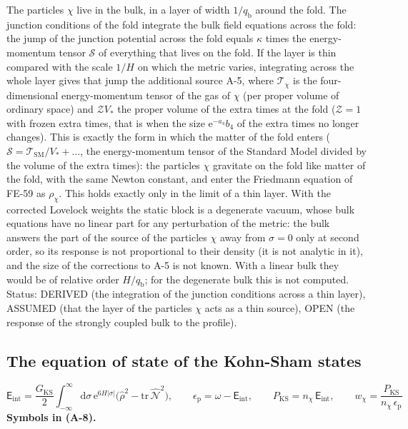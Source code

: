 \documentclass[
  10pt,
]{article}
\begin{document}
The particles \(\chi\) live in the bulk, in a layer of width
\(1/q_{\mathrm{b}}\) around the fold. The junction conditions of the
fold integrate the bulk field equations across the fold: the jump of the
junction potential across the fold equals \(\kappa\) times the
energy-momentum tensor \(\mathcal{S}\) of everything that lives on the
fold. If the layer is thin compared with the scale \(1/H\) on which the
metric varies, integrating across the whole layer gives that jump the
additional source A-5, where \(\mathcal{T}_\chi\) is the
four-dimensional energy-momentum tensor of the gas of \(\chi\) (per
proper volume of ordinary space) and \(\mathcal{Z}V_*\) the proper
volume of the extra times at the fold (\(\mathcal{Z} = 1\) with frozen
extra times, that is when the size \(\mathrm{e}^{-a_4}b_4\) of the extra
times no longer changes). This is exactly the form in which the matter
of the fold enters
(\(\mathcal{S} = \mathcal{T}_{\mathrm{SM}}/V_* + \dots\), the
energy-momentum tensor of the Standard Model divided by the volume of
the extra times): the particles \(\chi\) gravitate on the fold like
matter of the fold, with the same Newton constant, and enter the
Friedmann equation of FE-59 as \(\rho_\chi\). This holds exactly only in
the limit of a thin layer. With the corrected Lovelock weights the
static block is a degenerate vacuum, whose bulk equations have no linear
part for any perturbation of the metric: the bulk answers the part of
the source of the particles \(\chi\) away from \(\sigma = 0\) only at
second order, so its response is not proportional to their density (it
is not analytic in it), and the size of the corrections to A-5 is not
known. With a linear bulk they would be of relative order
\(H/q_{\mathrm{b}}\); for the degenerate bulk this is not computed.
Status: DERIVED (the integration of the junction conditions across a
thin layer), ASSUMED (that the layer of the particles \(\chi\) acts as a
thin source), OPEN (the response of the strongly coupled bulk to the
profile).

\hypertarget{the-equation-of-state-of-the-kohn-sham-states}{%
\subsection{The equation of state of the Kohn-Sham
states}\label{the-equation-of-state-of-the-kohn-sham-states}}

\[
\mathsf{E}_{\mathrm{int}} = \frac{G_{\mathrm{KS}}}{2}\int_{-\infty}^{\infty}\mathrm{d}\sigma\,\mathrm{e}^{6H\lvert\sigma\rvert}\Big(\hat\rho^2 - \mathrm{tr}\,\hat{\mathcal{N}}^2\Big),\qquad
\epsilon_{\mathrm{p}} = \omega - \mathsf{E}_{\mathrm{int}},\qquad P_{\mathrm{KS}} = n_\chi\,\mathsf{E}_{\mathrm{int}},\qquad
w_\chi = \frac{P_{\mathrm{KS}}}{n_\chi\,\epsilon_{\mathrm{p}}} \tag{A-8}
\] \textbf{Symbols in (A-8).}
\end{document}
